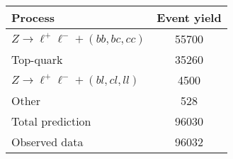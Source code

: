 %

\begin{tabular}{lS[table-format=5.0(4)]}
  \toprule
  Process & {Event yield} \\
  \midrule
  $Z \to \ell^+\ell^- + (bb,bc,cc)$ & 55700  \\
  Top-quark & 35260  \\
  $Z \to \ell^+\ell^- + (bl,cl,ll)$ & 4500  \\
  Other & 528  \\
  \midrule
  Total prediction & 96030  \\
  \midrule
  Observed data & 96032 \\
  \bottomrule
\end{tabular}

